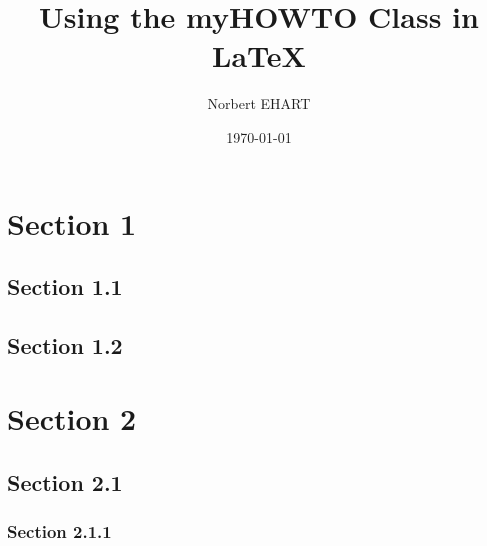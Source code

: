 \documentclass[]{myHOWTO-V1}
\title{Using the myHOWTO Class in \LaTeX}
\author{Norbert EHART}
\date{\today}
\begin{document}
	
\section{Section 1}
\lipsum[9-10]

\subsection{Section 1.1}
\lipsum[4]

\subsection{Section 1.2}
\lipsum[5]

\section{Section 2}
\lipsum[9-10]

\subsection{Section 2.1}
\lipsum[4]

\subsubsection{Section 2.1.1}
\lipsum[5]
\end{document}
